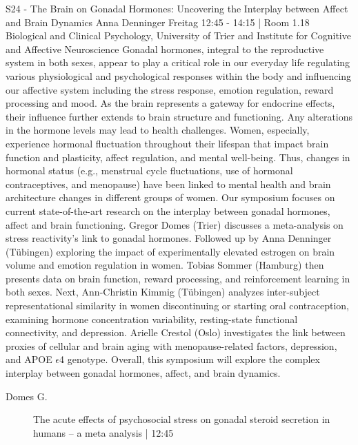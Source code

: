 
            \begin{symposium}
            {S24 - The Brain on Gonadal Hormones: Uncovering the Interplay between Affect and Brain Dynamics}
            {Anna Denninger}
            {Freitag 12:45 - 14:15 | Room 1.18}
            {Biological and Clinical Psychology, University of Trier and Institute for Cognitive and Affective Neuroscience}
            Gonadal hormones, integral to the reproductive system in both sexes, appear to play a critical role in our everyday life regulating various physiological and psychological responses within the body and influencing our affective system including the stress response, emotion regulation, reward processing and mood. As the brain represents a gateway for endocrine effects, their influence further extends to brain structure and functioning. Any alterations in the hormone levels may lead to health challenges. Women, especially, experience hormonal fluctuation throughout their lifespan that impact brain function and plasticity, affect regulation, and mental well-being. Thus, changes in hormonal status (e.g., menstrual cycle fluctuations, use of hormonal contraceptives, and menopause) have been linked to mental health and brain architecture changes in different groups of women. Our symposium focuses on current state-of-the-art research on the interplay between gonadal hormones, affect and brain functioning. Gregor Domes (Trier) discusses a meta-analysis on stress reactivity’s link to gonadal hormones. Followed up by Anna Denninger (Tübingen) exploring the impact of experimentally elevated estrogen on brain volume and emotion regulation in women. Tobias Sommer (Hamburg) then presents data on brain function, reward processing, and reinforcement learning in both sexes. Next, Ann-Christin Kimmig (Tübingen) analyzes inter-subject representational similarity in women discontinuing or starting oral contraception, examining hormone concentration variability, resting-state functional connectivity, and depression. Arielle Crestol (Oslo) investigates the link between proxies of cellular and brain aging with menopause-related factors, depression, and APOE $\epsilon$4 genotype. Overall, this symposium will explore the complex interplay between gonadal hormones, affect, and brain dynamics.
            \begin{description}    
            
                \item [ Domes G.] The acute effects of psychosocial stress on gonadal steroid secretion in humans – a meta analysis \textcolor{mygray}{ | 12:45}    
                

\end{description}
\end{symposium}
